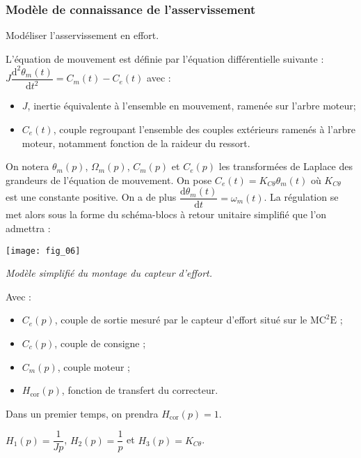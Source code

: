 \begin{multicols}{2}
\subsubsection*{Modèle de connaissance de l'asservissement}

\begin{obj}
Modéliser l’asservissement en effort.
\end{obj}

L’équation de mouvement est définie par l’équation différentielle suivante : 
$J\dfrac{\text{d}^2\theta_m(t)}{\text{d}t^2}=C_m(t)-C_e(t)$  avec :
\begin{itemize}
\item $J$, inertie équivalente à l’ensemble en mouvement, ramenée sur l’arbre moteur;
\item $C_e(t)$, couple regroupant l’ensemble des couples extérieurs ramenés à l’arbre moteur, notamment fonction de la raideur du ressort.
\end{itemize}


On notera $\theta_m(p)$, $\Omega_m(p)$, $C_m(p)$ et $C_e(p)$ les transformées de Laplace des grandeurs de l’équation de mouvement.
On pose $C_e(t)=K_{C\theta}\theta_m(t)$ où  $K_{C\theta}$ est une constante positive. On a de plus $\dfrac{\text{d}\theta_m(t)}{\text{d}t}=\omega_m(t)$. La régulation se met alors sous la forme du schéma-blocs à retour unitaire simplifié que l’on
admettra :

\begin{center}
\texttt{[image: fig\_06]}

\textit{Modèle simplifié du montage du capteur d’effort.}
\end{center}

Avec :
\begin{itemize}
\item $C_e(p)$, couple de sortie mesuré par le capteur d’effort situé sur le $\text{MC}^2\text{E}$ ;
\item $C_c(p)$, couple de consigne ;
\item $C_m(p)$, couple moteur ;
\item $H_{\text{cor}}(p)$, fonction de transfert du correcteur.
\end{itemize}
Dans un premier temps, on prendra $H_{\text{cor}}(p)=1$.

\ifprof
\begin{corrige}
$H_1(p)=\dfrac{1}{Jp}$, $H_2(p)=\dfrac{1}{p}$ et $H_3(p)=K_{C\theta}$.
\end{corrige}
\else
\fi


\end{multicols}
